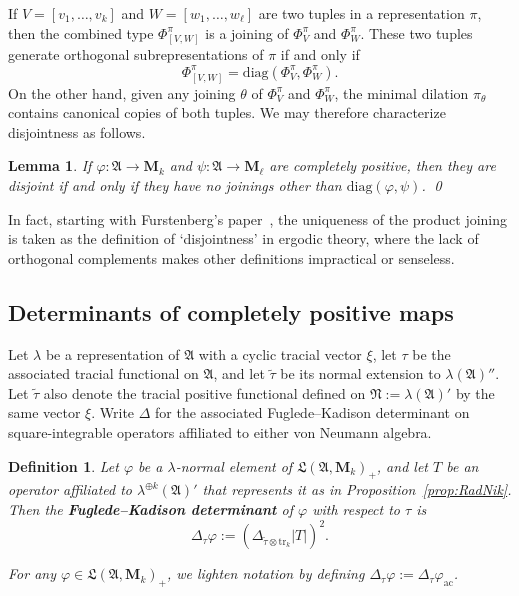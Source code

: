 \documentclass[12pt,a4paper]{article}
\numberwithin{equation}{section}
\newtheorem{lem}[thm]{Lemma}
\newtheorem{dfn}[thm]{Definition}
\theoremstyle{remark}
\renewcommand{\rm}[1]{\mathrm{#1}}
\newcommand{\rmM}{\mathbf{M}}
\newcommand{\A}{\mathfrak{A}}
\newcommand{\frL}{\mathfrak{L}}
\newcommand{\N}{\mathfrak{N}}
\renewcommand{\phi}{\varphi}
\renewcommand{\l}{\lambda}
\renewcommand{\t}[1]{\widetilde{#1}}
\newcommand{\Tr}{\mathrm{tr}}
\begin{document}
If $V = [v_1, \dots, v_k]$ and $W = [w_1,\dots,w_\ell]$ are two tuples in a representation $\pi$, then the combined type $\Phi^\pi_{[V,W]}$ is a joining of $\Phi^\pi_V$ and $\Phi^\pi_W$.  These two tuples generate orthogonal subrepresentations of $\pi$ if and only if
\[\Phi^\pi_{[V,W]} = \rm{diag}(\Phi^\pi_V,\Phi^\pi_W).\]
On the other hand, given any joining $\theta$ of $\Phi^\pi_V$ and $\Phi^\pi_W$, the minimal dilation $\pi_\theta$ contains canonical copies of both tuples.  We may therefore characterize disjointness as follows.

\begin{lem}\label{lem:disjoint-no-join-0}
If $\phi:\A\to \rmM_k$ and $\psi:\A \to \rmM_\ell$ are completely positive, then they are disjoint if and only if they have no joinings other than $\rm{diag}(\phi,\psi)$. \qed
\end{lem}

In fact, starting with Furstenberg's paper~\cite{Fur67}, the uniqueness of the product joining is taken as the definition of `disjointness' in ergodic theory, where the lack of orthogonal complements makes other definitions impractical or senseless.

















\subsection{Determinants of completely positive maps}

Let $\l$ be a representation of $\A$ with a cyclic tracial vector $\xi$, let $\tau$ be the associated tracial functional on $\A$, and let $\t{\tau}$ be its normal extension to $\l(\A)''$.  Let $\t{\tau}$ also denote the tracial positive functional defined on $\N := \l(\A)'$ by the same vector $\xi$. Write $\Delta$ for the associated Fuglede--Kadison determinant on square-integrable operators affiliated to either von Neumann algebra.

\begin{dfn}\label{dfn:FK-det-ac}
Let $\phi$ be a $\l$-normal element of $\frL(\A,\rmM_k)_+$, and let $T$ be an operator affiliated to $\l^{\oplus k}(\A)'$ that represents it as in Proposition~\ref{prop:RadNik}.  Then the \textbf{Fuglede--Kadison determinant} of $\phi$ with respect to $\tau$ is
\begin{equation}\label{eq:FK-det-ac}
\Delta_\tau \phi := (\Delta_{\t{\tau}\otimes \Tr_k} |T|)^2.
\end{equation}

For any $\phi \in \frL(\A,\rmM_k)_+$, we lighten notation by defining $\Delta_\tau \phi := \Delta_\tau \phi_{\rm{ac}}$.
\end{dfn}
\end{document}
